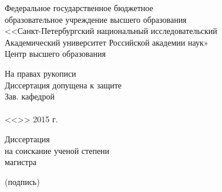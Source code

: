\begin{titlepage}
\large
\newpage

\begin{center}
Федеральное государственное бюджетное \\
образовательное учреждение высшего образования \\
<<Санкт-Петербургский национальный исследовательский \\
Академический университет Российской академии наук» \\
Центр высшего образования \\
\end{center}

\begin{flushright}
\begin{minipage}[t][12em][c]{30ex}
\begin{center}
На правах рукописи \\
\medskip
Диссертация допущена к защите \\
Зав. кафедрой \\
\hrulefill \\
<<\hspace{2em}>> \hspace{1ex} \hrulefill \hspace{1ex} 2015 г.\\
\end{center}
\end{minipage}
\end{flushright}

\begin{center}
Диссертация \\
на соискание ученой степени \\
магистра \\
\end{center}


\vspace{0.5cm}


\vspace{0.5cm}

\vspace{1cm}

\begin{center}
    \small (подпись)
\end{center}


\end{titlepage}

